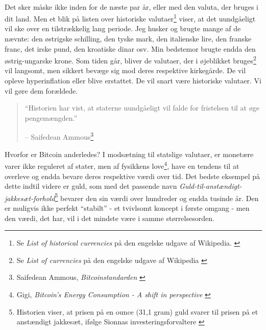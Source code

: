 \documentclass[paper=6in:9in,pagesize=pdftex,headinclude=on,footinclude=on,12pt]{scrbook}
\begin{document}
\paragraph{} Det sker måske ikke inden for de næste par år, eller med den valuta, der bruges i dit land. Men et blik på listen over historiske valutaer\footnote{Se \textit{List of historical currencies} på den engelske udgave af Wikipedia. \cite{wiki:historical-currencies}} viser, at det uundgåeligt vil ske over en tilstrækkelig lang periode. Jeg husker og brugte mange af de nævnte: den østrigske schilling, den tyske mark, den italienske lire, den franske franc, det irske pund, den kroatiske dinar osv. Min bedstemor brugte endda den østrig-ungarske krone. Som tiden går, bliver de valutaer, der i øjeblikket bruges\footnote{Se \textit{List of currencies} på den engelske udgave af Wikipedia \cite{wiki:list-of-currencies}} vil langsomt, men sikkert bevæge sig mod deres respektive kirkegårde. De vil opleve hyperinflation eller blive erstattet. De vil snart være historiske valutaer. Vi vil gøre dem forældede.\begin{quotation}\begin{samepage} \enquote{Historien har vist, at staterne uundgåeligt vil falde for fristelsen til at øge pengemængden.} \begin{flushright} -- Saifedean Ammous\footnote{Saifedean Ammous, \textit{Bitcoinstandarden} \cite{bitcoin-standard}}
\end{flushright}\end{samepage}\end{quotation}

\newpage

Hvorfor er Bitcoin anderledes? I modsætning til statslige valutaer, er monetære varer ikke reguleret af stater, men af fysikkens love\footnote{Gigi, \textit{Bitcoin's Energy Consumption - A shift in perspective} \cite{gigi:energy}}, have en tendens til at overleve og endda bevare deres respektive værdi over tid. Det bedste eksempel på dette indtil videre er guld, som med det passende navn \textit{Guld-til-anstændigt-jakkesæt-forhold}\footnote{Historien viser, at prisen på en ounce (31,1 gram) guld svarer til prisen på et anstændigt jakkesæt, ifølge Sionnas investeringsforvaltere \cite{web:gold-to-decent-suite-ratio}} bevarer den sin værdi over hundreder og endda tusinde år. Den er muligvis ikke perfekt \enquote{stabilt} - et tvivlsomt koncept i første omgang - men den værdi, det har, vil i det mindste være i samme størrelsesorden.
\end{document}
